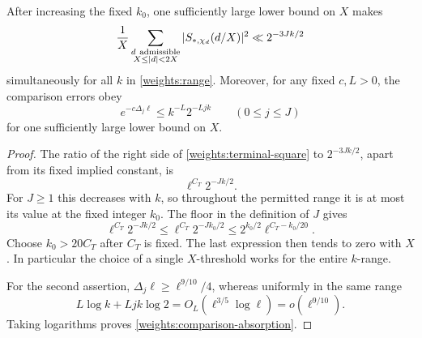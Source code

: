 \begin{lemma}
\label{weights:terminal-small}
After increasing the fixed \(k_0\), one sufficiently large lower
bound on \(X\) makes
\begin{equation}
 \frac1X\sum_{\substack{d\ {\rm admissible}\\X\le|d|<2X}}
       |S_{*,\chi_d}(d/X)|^2
       \ll 2^{-3Jk/2}
 \label{weights:terminal-small-square}
\end{equation}
simultaneously for all \(k\) in \eqref{weights:range}.
Moreover, for any fixed \(c,L>0\), the comparison errors obey
\begin{equation}
 e^{-c\Delta_j\ell}
       \le k^{-L}2^{-Ljk}\qquad(0\le j\le J)
 \label{weights:comparison-absorption}
\end{equation}
for one sufficiently large lower bound on \(X\).
\end{lemma}

\begin{proof}
The ratio of the right side of
\eqref{weights:terminal-square} to \(2^{-3Jk/2}\), apart from its
fixed implied constant, is
\[
 \ell^{C_T}2^{-Jk/2}.
\]
For \(J\ge1\) this decreases with \(k\), so throughout the permitted
range it is at most its value at the fixed integer \(k_0\).
The floor in the definition of \(J\) gives
\[
 \ell^{C_T}2^{-Jk/2}
       \le \ell^{C_T}2^{-Jk_0/2}
       \le 2^{k_0/2}\ell^{C_T-k_0/20}.
\]
Choose \(k_0>20C_T\) after \(C_T\) is fixed. The last expression
then tends to zero with \(X\). In particular the choice of a
single \(X\)-threshold works for the entire \(k\)-range.

For the second assertion,
\(\Delta_j\ell\ge\ell^{9/10}/4\), whereas uniformly in the same
range
\[
 L\log k+Ljk\log2
       =O_L(\ell^{3/5}\log\ell)=o(\ell^{9/10}).
\]
Taking logarithms proves \eqref{weights:comparison-absorption}.
\end{proof}
